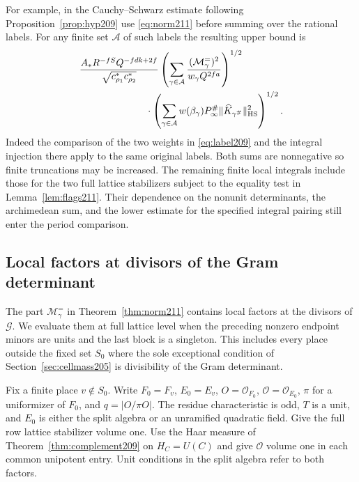 \documentclass[a4paper,11pt]{article}
\theoremstyle{definition}
\theoremstyle{remark}
\numberwithin{equation}{section}
\begin{document}
For example, in the Cauchy--Schwarz estimate following
Proposition~\ref{prop:hyp209} use \eqref{eq:norm211} before
summing over the rational labels. For any finite set
\(\mathcal A\) of such labels the resulting upper bound is
\begin{align*}
 &\frac{A_*R^{-fS}Q^{-fdk+2f}}
           {\sqrt{c_{\rho_1}^*c_{\rho_2}^*}}
 \left(\sum_{\gamma\in\mathcal A}
      \frac{(\mathcal M_\gamma^{=})^2}{w_\gamma Q^{2fa}}\right)^{1/2}\\
 &\hspace{24mm}\cdot
 \left(\sum_{\gamma\in\mathcal A}
 w(\beta_\gamma)P_\infty^\#
             \|\widehat K_{\gamma^\#}\|_{\rm HS}^2\right)^{1/2}.
\end{align*}
Indeed the comparison of the two weights in \eqref{eq:label209}
and the integral injection there apply to the same original
labels. Both sums are nonnegative so finite truncations may be
increased. The remaining finite local integrals include those
for the two full lattice stabilizers subject to the equality
test in Lemma~\ref{lem:flags211}. Their dependence on the
nonunit determinants, the archimedean sum, and the lower estimate
for the specified integral pairing still enter the period comparison.

\subsection{Local factors at divisors of the Gram determinant}\label{nav:IX-06}
\label{sec:localmass213}

The part \(\mathcal M_\gamma^{=}\) in Theorem~\ref{thm:norm211}
contains local factors at the divisors of \(\mathcal G\). We
evaluate them at full lattice level when the preceding nonzero
endpoint minors are units and the last block is a singleton.
This includes every place outside the fixed set \(S_0\) where
the sole exceptional condition of Section~\ref{sec:cellmass205}
is divisibility of the Gram determinant.

Fix a finite place \(v\notin S_0\). Write \(F_0=F_v\), \(E_0=E_v\),
\(O=\mathcal O_{F_0}\), \(\mathcal O=\mathcal O_{E_0}\),
\(\pi\) for a uniformizer of \(F_0\), and \(q=|O/\pi O|\).
The residue characteristic is odd, \(T\) is a unit, and \(E_0\)
is either the split algebra or an unramified quadratic field.
Give the full row lattice stabilizer volume one. Use the Haar
measure of Theorem~\ref{thm:complement209} on \(H_C=U(C)\)
and give \(\mathcal O\) volume one in each common unipotent
entry. Unit conditions in the split algebra refer to both factors.
\end{document}
